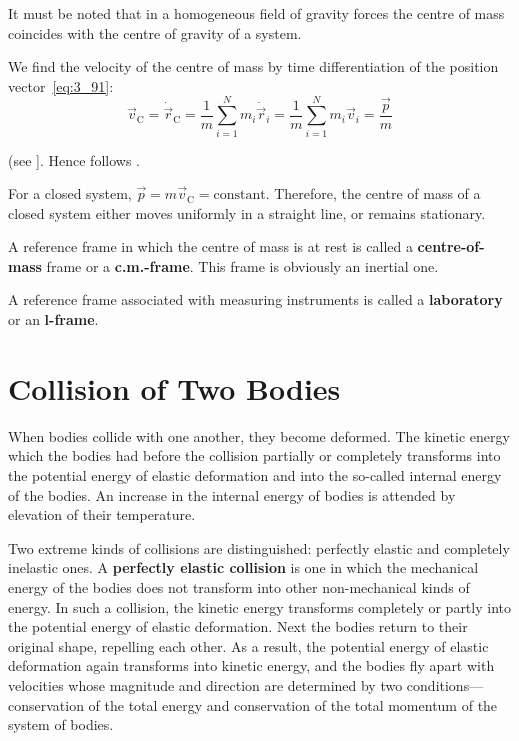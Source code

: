 \noindent
It must be noted that in a homogeneous field of gravity forces the centre of mass coincides with the centre of gravity of a system.

We find the velocity of the centre of mass by time differentiation of the position vector~\eqref{eq:3_91}:
\begin{equation*}
\vec{v}_{\text{C}} = \dot{\vec{r}}_{\text{C}} = \frac{1}{m}\sum_{i=1}^N m_i\dot{\vec{r}}_i = \frac{1}{m} \sum_{i=1}^N m_i\vec{v}_i = \frac{\vec{p}}{m}
\end{equation*}

\noindent
(see ]. Hence follows .

For a closed system, $\vec{p}=m\vec{v}_{\text{C}}=\text{constant}$. Therefore, the centre of mass of a closed system either moves uniformly in a straight line, or remains stationary.

A reference frame in which the centre of mass is at rest is called a \textbf{centre-of-mass} frame or a \textbf{c.m.-frame}. This frame is obviously an inertial one.

A reference frame associated with measuring instruments is called a \textbf{laboratory} or an \textbf{l-frame}.

\section{Collision of Two Bodies}\label{sec:3_11}

When bodies collide with one another, they become deformed.  The kinetic energy which the bodies had before the collision partially or completely transforms into the potential energy of elastic deformation and into the so-called internal energy of the bodies. An increase in the internal energy of bodies is attended by elevation of their temperature.

Two extreme kinds of collisions are distinguished: perfectly elastic and completely inelastic ones. A \textbf{perfectly elastic collision} is one in which the mechanical energy of the bodies does not transform into other non-mechanical kinds of energy. In such a collision, the kinetic energy transforms completely or partly into the potential energy of elastic deformation. Next the bodies return to their original shape, repelling each other. As a result, the potential energy of elastic deformation again transforms into kinetic energy, and the bodies fly apart with velocities whose magnitude and direction are determined by two conditions---conservation of the total energy and conservation of the total momentum of the system of bodies.

